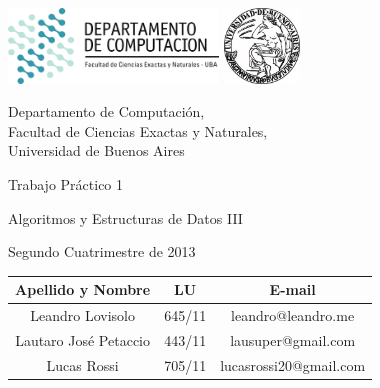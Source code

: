 \documentclass[a4paper,10pt,twoside]{article}
\begin{document}


\thispagestyle{caratula}

\begin{center}

\includegraphics[height=2cm]{DC.png} 
\hfill
\includegraphics[height=2cm]{UBA.jpg} 

\vspace{2cm}

Departamento de Computación,\\
Facultad de Ciencias Exactas y Naturales,\\
Universidad de Buenos Aires

\vspace{4cm}

\begin{Huge}
Trabajo Práctico 1
\end{Huge}

\vspace{0.5cm}

\begin{Large}
Algoritmos y Estructuras de Datos III
\end{Large}

\vspace{1cm}

Segundo Cuatrimestre de 2013

\vspace{4cm}

\begin{tabular}{|c|c|c|}
\hline
Apellido y Nombre & LU & E-mail\\
\hline
Leandro Lovisolo      & 645/11 & leandro@leandro.me\\
Lautaro José Petaccio & 443/11 & lausuper@gmail.com\\
Lucas Rossi           & 705/11 & lucasrossi20@gmail.com\\
\hline
\end{tabular}

\end{center}
\end{document}
